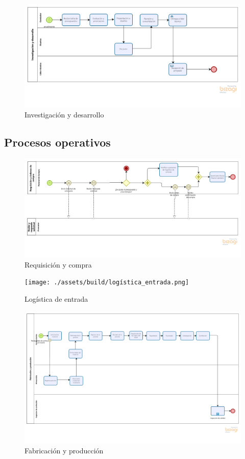 \documentclass[11pt]{article}
\begin{document}
\begin{figure}[H]
\centering
\includegraphics[width=.9\linewidth]{./assets/build/investigacion.png}
\caption{\label{fig:investigacion} Investigación y desarrollo}
\end{figure}

\subsection{Procesos operativos}
\begin{figure}[H]
\centering
\includegraphics[width=.9\linewidth]{./assets/build/requisicion_compra.png}
\caption{\label{fig:req_compra}Requisición y compra}
\end{figure}

\begin{figure}[H]
\centering
\texttt{[image: ./assets/build/logística\_entrada.png]}
\caption{\label{fig:log_entrada}Logística de entrada}
\end{figure}

\begin{figure}[H]
\centering
\includegraphics[width=.9\linewidth]{./assets/build/fabricacion_produccion.png}
\caption{\label{fig:fab_prod}Fabricación y producción}
\end{figure}
\end{document}
